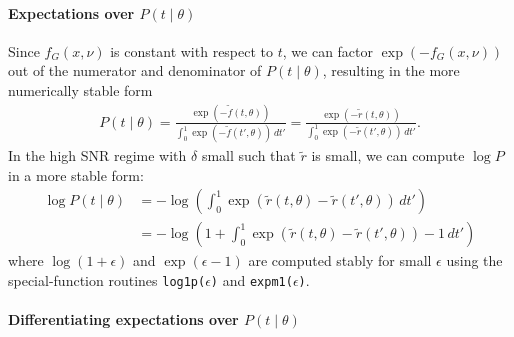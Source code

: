 \documentclass{article}
\begin{document}
\paragraph{Expectations over $P(t \mid \theta)$}\label{sec:expectation-covariance}

Since $f_G(x,\nu)$ is constant with respect to $t$, we can factor $\exp(-f_G(x,\nu))$ out of the numerator and denominator of $P(t \mid \theta)$, resulting in the more numerically stable form
%
\begin{align}
  P(t \mid \theta)
  = \frac{\exp(-\tilde{f}(t, \theta))}{\int_0^1 \exp(-\tilde{f}(t', \theta)) \, dt'}
  = \frac{\exp(-\tilde{r}(t, \theta))}{\int_0^1 \exp(-\tilde{r}(t', \theta)) \, dt'}.
\end{align}
%
In the high SNR regime with $\delta$ small such that $\tilde{r}$ is small, we can compute $\log P$ in a more stable form:
%
\begin{align}
  \log P(t \mid \theta)
   & = -\log \left( \int_0^1 \exp(\tilde{r}(t, \theta) - \tilde{r}(t', \theta)) \, dt' \right)        \\
   & = -\log \left(1 + \int_0^1 \exp(\tilde{r}(t, \theta) - \tilde{r}(t', \theta)) - 1 \, dt' \right)
\end{align}
%
where $\log(1 + \epsilon)$ and $\exp(\epsilon - 1)$ are computed stably for small $\epsilon$ using the special-function routines \texttt{log1p($\epsilon$)} and \texttt{expm1($\epsilon$)}.

\paragraph{Differentiating expectations over $P(t \mid \theta)$}\label{sec:jacobian-expectation-covariance}
\end{document}
